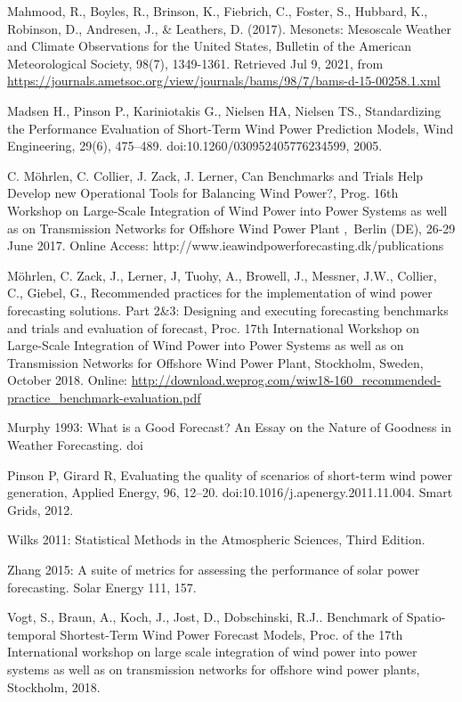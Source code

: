 \begin{thebibliography}{27}
Mahmood, R., Boyles, R., Brinson, K., Fiebrich, C., Foster, S., Hubbard, K., Robinson, D., Andresen, J., & Leathers, D. (2017). Mesonets: Mesoscale Weather and Climate Observations for the United States, Bulletin of the American Meteorological Society, 98(7), 1349-1361. Retrieved Jul 9, 2021, from \url{https://journals.ametsoc.org/view/journals/bams/98/7/bams-d-15-00258.1.xml}

Madsen H., Pinson P., Kariniotakis G., Nielsen HA, Nielsen TS., Standardizing the Performance Evaluation of Short-Term Wind Power Prediction Models, Wind Engineering, 29(6), 475–489. doi:10.1260/030952405776234599, 2005.

C. M\"ohrlen, C. Collier, J. Zack, J. Lerner, Can Benchmarks and Trials Help Develop new Operational Tools for Balancing Wind Power?, Prog. 16th Workshop on Large-Scale Integration of Wind Power into Power Systems as well as on Transmission Networks for Offshore Wind Power Plant , Berlin (DE), 26-29 June 2017.
Online Access: http://www.ieawindpowerforecasting.dk/publications

M\"ohrlen, C. Zack, J., Lerner, J, Tuohy, A., Browell, J., Messner, J.W., Collier, C.,  Giebel, G., Recommended practices for the implementation of wind power forecasting solutions. Part 2\&3: Designing and executing forecasting benchmarks and trials and evaluation of forecast, Proc. 17th International Workshop on Large-Scale Integration of Wind Power into Power Systems as well as on Transmission Networks for Offshore Wind Power Plant, Stockholm, Sweden, October 2018. Online: \url{http://download.weprog.com/wiw18-160_recommended-practice_benchmark-evaluation.pdf}

Murphy 1993: What is a Good Forecast? An Essay on the Nature of Goodness in Weather Forecasting. doi

Pinson P, Girard R, Evaluating the quality of scenarios of short-term wind power generation, Applied Energy, 96, 12–20. doi:10.1016/j.apenergy.2011.11.004. Smart Grids, 2012.

Wilks 2011: Statistical Methods in the Atmospheric Sciences, Third Edition.

Zhang 2015: A suite of metrics for assessing the performance of solar power forecasting. Solar Energy 111, 157.

Vogt, S., Braun, A., Koch, J., Jost, D., Dobschinski, R.J.. Benchmark of Spatio-temporal Shortest-Term Wind Power Forecast Models, Proc. of the 17th International workshop on large scale integration of wind power into power systems as well as on transmission networks for offshore wind power plants, Stockholm, 2018.


\end{thebibliography}

